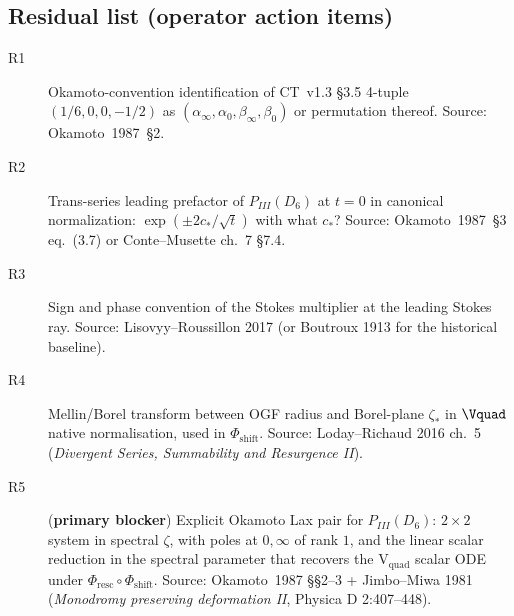 
\subsection*{Residual list (operator action items)}

\begin{description}
  \item[R1] Okamoto-convention identification of CT~v1.3 \S3.5
        4-tuple $(1/6, 0, 0, -1/2)$ as
        $(\alpha_\infty,\alpha_0,\beta_\infty,\beta_0)$ or
        permutation thereof. Source: Okamoto~1987~\S2.
  \item[R2] Trans-series leading prefactor of $P_{III}(D_6)$
        at $t=0$ in canonical normalization:
        $\exp(\pm 2 c_*/\sqrt{t})$ with what $c_*$?
        Source: Okamoto~1987~\S3 eq.~(3.7) or
        Conte--Musette ch.~7 \S7.4.
  \item[R3] Sign and phase convention of the Stokes
        multiplier at the leading Stokes ray. Source:
        Lisovyy--Roussillon 2017 (or Boutroux 1913 for the
        historical baseline).
  \item[R4] Mellin/Borel transform between OGF radius and
        Borel-plane $\zeta_*$ in $\Vquad$ native
        normalisation, used in $\Phi_\mathrm{shift}$.
        Source: Loday--Richaud 2016 ch.~5
        (\textsl{Divergent Series, Summability and Resurgence II}).
  \item[R5] (\textbf{primary blocker}) Explicit Okamoto Lax
        pair for $P_{III}(D_6)$: $2\times 2$ system in spectral
        $\zeta$, with poles at $0,\infty$ of rank $1$, and the
        linear scalar reduction in the spectral parameter that
        recovers the V$_\mathrm{quad}$ scalar ODE under
        $\Phi_\mathrm{resc}\circ\Phi_\mathrm{shift}$.
        Source: Okamoto~1987 \S\S2--3 + Jimbo--Miwa 1981
        (\textsl{Monodromy preserving deformation II},
        Physica D 2:407--448).
\end{description}
